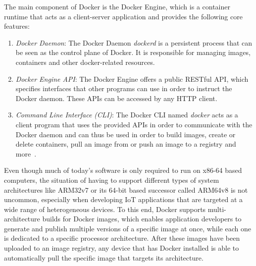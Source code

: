 The main component of Docker is the Docker Engine, which is a container runtime that acts as a client-server application and provides the following core features:

\begin{enumerate}
    \item \textit{Docker Daemon}: The Docker Daemon \textit{dockerd} is a persistent process that can be seen as the control plane of Docker. It is responsible for managing images, containers and other docker-related resources.
    \item \textit{Docker Engine API}: The Docker Engine offers a public RESTful API, which specifies interfaces that other programs can use in order to instruct the Docker daemon. These APIs can be accessed by any HTTP client.
    \item \textit{Command Line Interface (CLI)}: The Docker CLI named \textit{docker} acts as a client program that uses the provided APIs in order to communicate with the Docker daemon and can thus be used in order to build images, create or delete containers, pull an image from or push an image to a registry and more~\parencite{docker-engine}.
\end{enumerate}

Even though much of today's software is only required to run on x86-64 based computers, the situation of having to support different types of system architectures like ARM32v7 or its 64-bit based successor called ARM64v8 is not uncommon, especially when developing IoT applications that are targeted at a wide range of heterogeneous devices. To this end, Docker supports multi-architecture builds for Docker images, which enables application developers to generate and publish multiple versions of a specific image at once, while each one is dedicated to a specific processor architecture. After these images have been uploaded to an image registry, any device that has Docker installed is able to automatically pull the specific image that targets its architecture.


